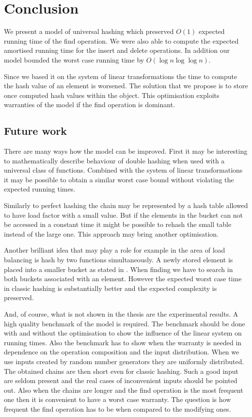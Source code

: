 \chapter{Conclusion}
We present a model of universal hashing which preserved $O(1)$ expected running time of the find operation. We were also able to compute the expected amortised running time for the insert and delete operations. In addition our model bounded the worst case running time by $O(\log n \log \log n)$. 

Since we based it on the system of linear transformations the time to compute the hash value of an element is worsened. The solution that we propose is to store once computed hash values within the object. This optimisation exploits warranties of the model if the find operation is dominant. 

\section{Future work}
There are many ways how the model can be improved. First it may be interesting to mathematically describe behaviour of double hashing when used with a universal class of functions. Combined with the system of linear transformations it may be possible to obtain a similar worst case bound without violating the expected running times. 

Similarly to perfect hashing the chain may be represented by a hash table allowed to have load factor with a small value. But if the elements in the bucket can not be accessed in a constant time it might be possible to rehash the small table instead of the large one. This approach may bring another optimisation.

Another brilliant idea that may play a role for example in the area of load balancing is hash by two functions simultaneously. A newly stored element is placed into a smaller bucket as stated in \cite{1076315}. When finding we have to search in both buckets associated with an element. However the expected worst case time in classic hashing is substantially better and the expected complexity is preserved.

And, of course, what is not shown in the thesis are the experimental results. A high quality benchmark of the model is required. The benchmark should be done with and without the optimisation to show the influence of the linear system on running times. Also the benchmark has to show when the warranty is needed in dependence on the operation composition and the input distribution. When we use  inputs created by random number generators they are uniformly distributed. The obtained chains are then short even for classic hashing. Such a good input are seldom present and the real cases of inconvenient inputs should be pointed out. Also when the chains are longer and the find operation is the most frequent one then it is convenient to have a worst case warranty. The question is how frequent the find operation has to be when compared to the modifying ones.

